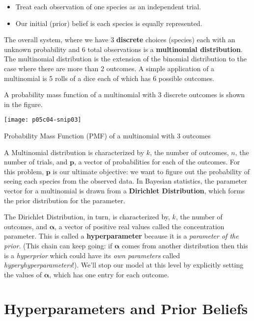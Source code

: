 \begin{itemize}
\item Treat each observation of one species as an independent trial.
\item Our initial (prior) belief is each species is equally represented.
\end{itemize}

The overall system, where we have 3 \textbf{discrete} choices (species) each with an unknown probability and 6 total observations is a\textbf{ multinomial distribution}. The multinomial distribution is the extension of the binomial distribution to the case where there are more than 2 outcomes. A simple application of a multinomial is 5 rolls of a dice each of which has 6 possible outcomes.

A probability mass function \cite{WikipeadiaProbabilitymassfunction2019} of a multinomial with 3 discrete outcomes is shown in the figure.

\begin{marginfigure}
    \texttt{[image: p05c04-snip03]}
    \caption{Probability Mass Function (PMF) of a multinomial with 3 outcomes}
    \end{marginfigure}

A Multinomial distribution is characterized by $k$, the number of outcomes, $n$, the number of trials, and 
$\mathbf {p}$, a vector of probabilities for each of the outcomes. For this problem, $\mathbf {p}$ is our ultimate objective: we want to figure out the probability of seeing each species from the observed data. In Bayesian statistics, the parameter vector for a multinomial is drawn from a \textbf{Dirichlet Distribution}, which forms the prior distribution for the parameter.

The Dirichlet Distribution, in turn, is characterized by, $k$, the number of outcomes, and  $\boldsymbol {\alpha }$, a vector of positive real values called the concentration parameter. This is called a \textbf{hyperparameter} because it is a \textit{parameter of the prior}. (This chain can keep going: if  $\boldsymbol {\alpha }$ comes from another distribution then this is a \textit{hyperprior} which could have its \textit{own parameters} called \textit{hyperyhyperparameters}!). We'll stop our model at this level by explicitly setting the values of $\boldsymbol {\alpha }$, which has one entry for each outcome.

\section{Hyperparameters and Prior Beliefs}

